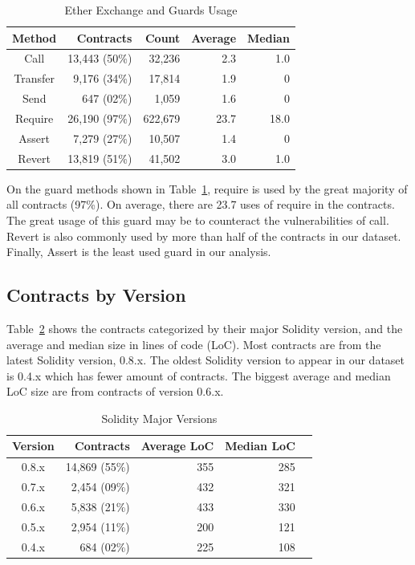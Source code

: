 \documentclass[10pt,conference]{IEEEtran}
\begin{document}
\begin{table}
\center
  \caption{Ether Exchange and Guards Usage}
  \label{tab:results-all}
  \begin{tabular}{crrrr}
    \hline
    Method & Contracts & Count & Average & Median \\
    \hline
    Call & 13,443 (50\%) & 32,236 & 2.3 & 1.0\\
    Transfer & 9,176 (34\%) & 17,814 & 1.9 & 0\\
    Send & 647 (02\%) & 1,059& 1.6 & 0\\
    Require & 26,190 (97\%) & 622,679 & 23.7 & 18.0 \\
    Assert & 7,279 (27\%) & 10,507 & 1.4 & 0\\
    Revert & 13,819 (51\%) & 41,502 & 3.0 & 1.0\\
    \hline
\end{tabular}
\end{table}

On the guard methods shown in Table~\ref{tab:results-all}, require is used by the great majority of all contracts (97\%). On average, there are 23.7 uses of require in the contracts. The great usage of this guard may be to counteract the vulnerabilities of call. Revert is also commonly used by more than half of the contracts in our dataset. Finally, Assert is the least used guard in our analysis.

\subsection{Contracts by Version}

Table~\ref{tab:major-versions} shows the contracts categorized by their major Solidity version, and the average and median size in lines of code (LoC). Most contracts are from the latest Solidity version, 0.8.x. The oldest Solidity version to appear in our dataset is 0.4.x which has fewer amount of contracts. The biggest average and median LoC size are from contracts of version 0.6.x.

\begin{table}
\center
  \caption{Solidity Major Versions}
  \label{tab:major-versions}
  \begin{tabular}{crrrr}
    \hline
    Version & Contracts & Average LoC & Median LoC \\
    \hline
    0.8.x & 14,869 (55\%) & 355 & 285 \\
    0.7.x & 2,454 (09\%) & 432 & 321 \\
    0.6.x & 5,838 (21\%) & 433 & 330 \\
    0.5.x & 2,954 (11\%) & 200 & 121 \\
    0.4.x & 684  (02\%) & 225 & 108 \\
  \hline
\end{tabular}
\end{table}
\end{document}
